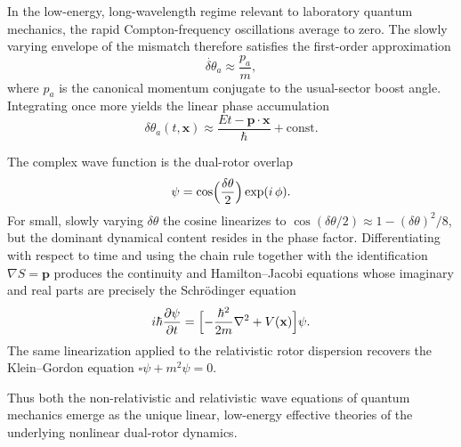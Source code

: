 \documentclass[dvipdfmx,a4paper]{article}
\begin{document}
In the low-energy, long-wavelength regime relevant to laboratory quantum mechanics, the rapid Compton-frequency oscillations average to zero. The slowly varying envelope of the mismatch therefore satisfies the first-order approximation
\[
\dot{\delta\theta}_a \approx \frac{p_a}{m},
\]
where \(p_a\) is the canonical momentum conjugate to the usual-sector boost angle. Integrating once more yields the linear phase accumulation
\[
\delta\theta_a(t,\mathbf{x}) \approx \frac{E t - \mathbf{p}\cdot\mathbf{x}}{\hbar} + \text{const}.
\]

The complex wave function is the dual-rotor overlap
\[
\psi = \cos\Bigl(\frac{\delta\theta}{2}\Bigr)\exp(i\,\phi).
\]
For small, slowly varying \(\delta\theta\) the cosine linearizes to \(\cos(\delta\theta/2) \approx 1 - (\delta\theta)^2/8\), but the dominant dynamical content resides in the phase factor. Differentiating with respect to time and using the chain rule together with the identification \(\nabla S = \mathbf{p}\) produces the continuity and Hamilton–Jacobi equations whose imaginary and real parts are precisely the Schrödinger equation
\[
i\hbar\frac{\partial\psi}{\partial t} = \Bigl[-\frac{\hbar^2}{2m}\nabla^2 + V(\mathbf{x})\Bigr]\psi.
\]
The same linearization applied to the relativistic rotor dispersion recovers the Klein–Gordon equation \(\square\psi + m^2\psi = 0\).

Thus both the non-relativistic and relativistic wave equations of quantum mechanics emerge as the unique linear, low-energy effective theories of the underlying nonlinear dual-rotor dynamics.
\end{document}
